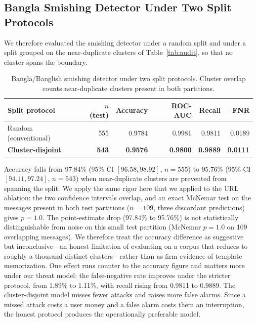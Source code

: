 \documentclass[preprint,12pt,number]{elsarticle}
\begin{document}
\subsection{Bangla Smishing Detector Under Two Split Protocols}
We therefore evaluated the smishing detector under a random split and under a split grouped on the near-duplicate clusters of Table~\ref{tab:audit}, so that no cluster spans the boundary.

\begin{table}[t]
\centering
\caption{Bangla/Banglish smishing detector under two split protocols. Cluster overlap counts near-duplicate clusters present in both partitions.}
\label{tab:sms}
\small
\begin{tabular}{lrrrrr}
\toprule
Split protocol & $n$ (test) & Accuracy & ROC-AUC & Recall & FNR \\
\midrule
Random (conventional) & 555 & 0.9784 & 0.9981 & 0.9811 & 0.0189 \\
\textbf{Cluster-disjoint} & \textbf{543} & \textbf{0.9576} & \textbf{0.9800} & \textbf{0.9889} & \textbf{0.0111} \\
\bottomrule
\end{tabular}
\end{table}

Accuracy falls from 97.84\% (95\% CI $[96.58, 98.92]$, $n=555$) to 95.76\% (95\% CI $[94.11, 97.24]$, $n=543$) when near-duplicate clusters are prevented from spanning the split. We apply the same rigor here that we applied to the URL ablation: the two confidence intervals overlap, and an exact McNemar test on the messages present in both test partitions ($n=109$, three discordant predictions) gives $p=1.0$. The point-estimate drop (97.84\% to 95.76\%) is not statistically distinguishable from noise on this small test partition (McNemar $p=1.0$ on 109 overlapping messages). We therefore treat the accuracy difference as suggestive but inconclusive---an honest limitation of evaluating on a corpus that reduces to roughly a thousand distinct clusters---rather than as firm evidence of template memorization. One effect runs counter to the accuracy figure and matters more under our threat model: the false-negative rate improves under the stricter protocol, from 1.89\% to 1.11\%, with recall rising from 0.9811 to 0.9889. The cluster-disjoint model misses fewer attacks and raises more false alarms. Since a missed attack costs a user money and a false alarm costs them an interruption, the honest protocol produces the operationally preferable model.
\end{document}
